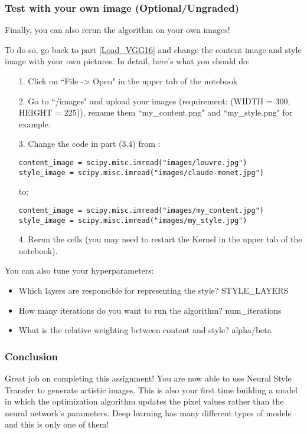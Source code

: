 {\subsubsection{Test with your own image (Optional/Ungraded)}
Finally, you can also rerun the algorithm on your own images! 

To do so, go back to part \ref{Load_VGG16} and change the content image and style image with your own pictures. In detail, here's what you should do:
\begin{itemize}
\item[1.] Click on ``File -> Open" in the upper tab of the notebook
\item[2.] Go to ``/images" and upload your images (requirement: (WIDTH = 300, HEIGHT = 225)), rename them ``my\_content.png" and ``my\_style.png" for example.
\item[3.] Change the code in part (3.4) from :
\begin{verbatim}
content_image = scipy.misc.imread("images/louvre.jpg")
style_image = scipy.misc.imread("images/claude-monet.jpg")
\end{verbatim}
to:
\begin{verbatim}
content_image = scipy.misc.imread("images/my_content.jpg")
style_image = scipy.misc.imread("images/my_style.jpg")
\end{verbatim}
\item[4.] Rerun the cells (you may need to restart the Kernel in the upper tab of the notebook).
\end{itemize}

You can also tune your hyperparameters: 
\begin{itemize}
\item Which layers are responsible for representing the style? STYLE\_LAYERS
\item How many iterations do you want to run the algorithm? num\_iterations
\item What is the relative weighting between content and style? alpha/beta
\end{itemize}


\clearpage
\subsubsection{Conclusion}
Great job on completing this assignment! You are now able to use Neural Style Transfer to generate artistic images. This is also your first time building a model in which the optimization algorithm updates the pixel values rather than the neural network's parameters. Deep learning has many different types of models and this is only one of them! \\

}
